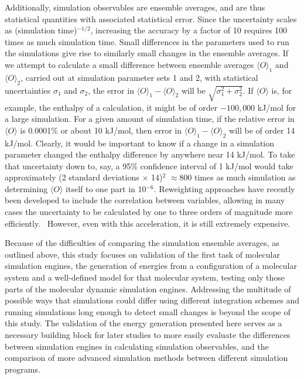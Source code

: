 Additionally, simulation observables are ensemble averages, and are
thus statistical quantities with associated statistical error. Since
the uncertainty scales as (simulation time)$^{-1/2}$, increasing the
accuracy by a factor of 10 requires 100 times as much simulation
time. Small differences in the parameters used to run the simulations
give rise to similarly small changes in the ensemble
averages. If we attempt to calculate a small difference between
ensemble averages $\langle O \rangle_1$ and $\langle O \rangle_2$,
carried out at simulation parameter sets 1 and 2, with statistical
uncertainties $\sigma_1$ and $\sigma_2$, the error in $\langle O
\rangle_1 - \langle O \rangle_2$ will be
$\sqrt{\sigma_1^2+\sigma_2^2}$. If $\langle O \rangle$ is, for
example, the enthalpy of a calculation, it might be of order
$-100,000$ kJ/mol for a large simulation.  For a given amount of
simulation time, if the relative error in $\langle O \rangle$ is
0.0001\% or about 10 kJ/mol, then error in $\langle O\rangle_1 -
\langle O \rangle_2$ will be of order 14 kJ/mol. Clearly, it would be
important to know if a change in a simulation parameter changed the
enthalpy difference by anywhere near 14 kJ/mol. To take that
uncertainty down to, say, a 95\% confidence interval of 1 kJ/mol would
take approximately (2 standard deviations $\times$ 14)$^2$ $\approx 800$ times as much
simulation as determining $\langle O \rangle$ itself to one part in
10$^{-6}$.  Reweighting approaches have recently been developed to
include the correlation between variables, allowing in many cases the
uncertainty to be calculated by one to three orders of magnitude more
efficiently.~\cite{Paliwal2013} However, even with this acceleration,
it is still extremely expensive.

Because of the difficulties of comparing the simulation ensemble
averages, as outlined above, this study focuses on validation of the
first task of molecular simulation engines, the generation of energies
from a configuration of a molecular system and a well-defined model
for that molecular system, testing only those parts of the molecular
dynamic simulation engines.  Addressing the multitude of possible ways
that simulations could differ using different integration schemes and
running simulations long enough to detect small changes is beyond the
scope of this study. The validation of the energy generation presented
here serves as a necessary building block for later studies to more
easily evaluate the differences between simulation engines in
calculating simulation observables, and the comparison of more
advanced simulation methods between different simulation programs.

